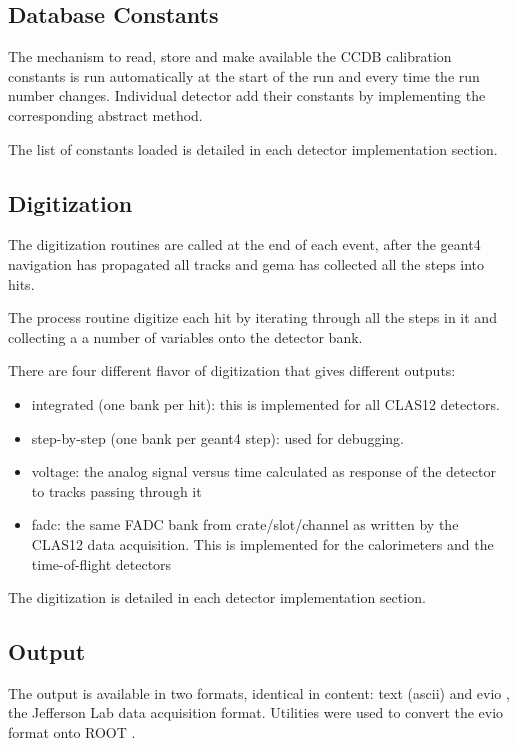 \subsection{Database Constants}

The mechanism to read, store and make available the CCDB \cite{ccdb} calibration constants is
run automatically at the start of the run and every time the run number changes.
Individual detector add their constants by implementing the corresponding abstract method.

The list of constants loaded is detailed in each detector implementation section.

\subsection{Digitization}

The digitization routines are called at the end of each event, after the geant4 navigation
has propagated all tracks and gema has collected all the steps into hits.

The process routine digitize each hit by iterating through all the steps in it and collecting a
a number of variables onto the detector bank.

There are four different flavor of digitization that gives different outputs:

\begin{itemize}
	\item integrated (one bank per hit): this is implemented for all CLAS12 detectors.
	\item step-by-step (one bank per geant4 step): used for debugging.
	\item voltage: the analog signal versus time calculated as response of the detector to tracks passing through it
    \item fadc: the same FADC bank from crate/slot/channel as written by the CLAS12 data acquisition.
          This is implemented for the calorimeters and the time-of-flight detectors
\end{itemize}


The digitization is detailed in each detector implementation section.


\subsection{Output}

The output is available in two formats, identical in content: text (ascii) and evio \cite{evio}, the Jefferson Lab
data acquisition format.
Utilities were used to convert the evio format onto ROOT \cite{root}.

